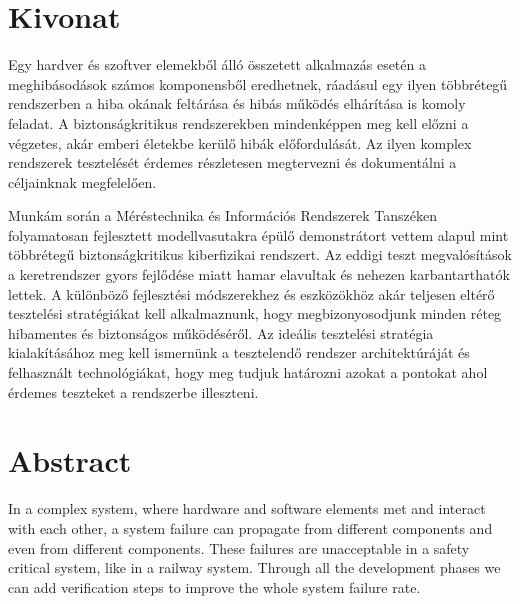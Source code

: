 
\setcounter{page}{1}

\selecthungarian

\chapter*{Kivonat}

Egy hardver és szoftver elemekből álló összetett alkalmazás esetén a meghibásodások számos komponensből eredhetnek, ráadásul egy ilyen többrétegű rendszerben a hiba okának feltárása és hibás működés elhárítása is komoly feladat. A biztonságkritikus rendszerekben mindenképpen meg kell előzni a végzetes, akár emberi életekbe kerülő hibák előfordulását. Az ilyen komplex rendszerek tesztelését érdemes részletesen megtervezni és dokumentálni a céljainknak megfelelően.

Munkám során a Méréstechnika és Információs Rendszerek Tanszéken folyamatosan fejlesztett modellvasutakra épülő demonstrátort vettem alapul mint többrétegű biztonságkritikus kiberfizikai rendszert. Az eddigi teszt megvalósítások a keretrendszer gyors fejlődése miatt hamar elavultak és nehezen karbantarthatók lettek.  A különböző fejlesztési módszerekhez és eszközökhöz akár teljesen eltérő tesztelési stratégiákat kell alkalmaznunk, hogy megbizonyosodjunk minden réteg hibamentes és biztonságos működéséről. Az ideális tesztelési stratégia kialakításához meg kell ismernünk a tesztelendő rendszer architektúráját és felhasznált technológiákat, hogy meg tudjuk határozni azokat a pontokat ahol érdemes teszteket a rendszerbe illeszteni.

\vfill
\selectenglish


\chapter*{Abstract}

In a complex system, where hardware and software  elements met and interact with each other, a system failure can propagate from different components and even from different components. These failures are unacceptable in a safety critical system, like in a railway system. Through all the development phases we can add verification steps to improve the whole system failure rate.

